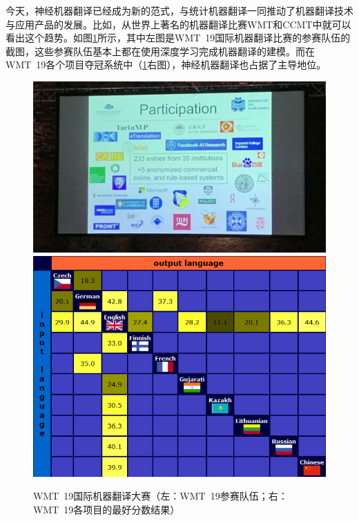 \parinterval 今天，神经机器翻译已经成为新的范式，与统计机器翻译一同推动了机器翻译技术与应用产品的发展。比如，从世界上著名的机器翻译比赛WMT和CCMT中就可以看出这个趋势。如图\ref{fig:1-6}所示，其中左图是WMT\ 19国际机器翻译比赛的参赛队伍的截图，这些参赛队伍基本上都在使用深度学习完成机器翻译的建模。而在WMT\ 19各个项目夺冠系统中（\ref{fig:1-6}右图），神经机器翻译也占据了主导地位。

\begin{figure}[htp]
    \centering
\includegraphics[scale=0.3]{./Chapter1/Figures/figure-wmt-participation.jpg}
\includegraphics[scale=0.3]{./Chapter1/Figures/figure-wmt-bestresults.jpg}
\setlength{\belowcaptionskip}{-1.5em}
    \caption{WMT\ 19国际机器翻译大赛（左：WMT\ 19参赛队伍；右：WMT\ 19各项目的最好分数结果）}
    \label{fig:1-6}
\end{figure}

